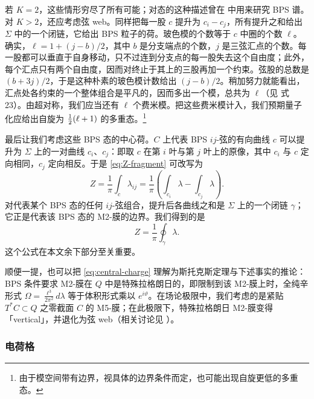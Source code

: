 
若 $K=2$，这些情形穷尽了所有可能；对态的这种描述曾在 \cite{Klemm:1996bj,Brandhuber:1996xk} 中用来研究 BPS 谱。对 $K>2$，还应考虑弦 web。同样把每一股 $c$ 提升为 $c_i - c_j$，所有提升之和给出 $\Sigma$ 中的一个闭链，它给出 BPS 粒子的荷。玻色模的个数等于 $c$ 中圈的个数 $\ell$。确实，$\ell = 1+(j-b)/2$，其中 $b$ 是分支端点的个数，$j$ 是三弦汇点的个数。每一股都可以垂直于自身移动，只不过连到分支点的每一股失去这个自由度；此外，每个汇点只有两个自由度，因而对终止于其上的三股再加一个约束。弦股的总数是 $(b+3j)/2$，于是这种朴素的玻色模计数给出 $(j-b)/2$。稍加努力就能看出，汇点处各约束的一个整体组合是平凡的，因而多出一个模，总共为 $\ell$（见 \cite{Aharony:1997bh} 式 23）。由超对称，我们应当还有 $\ell$ 个费米模。把这些费米模计入，我们预期量子化应给出自旋为 $\tfrac{1}{2}(\ell+1)$ 的多重态。\footnote{由于模空间带有边界，视具体的边界条件而定，也可能出现自旋更低的多重态。}

最后让我们考虑这些 BPS 态的中心荷。$C$ 上代表 BPS $ij$-弦的有向曲线 $c$ 可以提升为 $\Sigma$ 上的一对曲线 $c_i$、$c_j$：即取 $c$ 在第 $i$ 叶与第 $j$ 叶上的原像，其中 $c_i$ 与 $c$ 定向相同，$c_j$ 定向相反。于是 \eqref{eq:Z-fragment} 可改写为
\begin{equation} \label{eq:central-lambda}
Z = \frac{1}{\pi} \int_c \lambda_{ij} = \frac{1}{\pi} \left( \int_{c_i} \lambda - \int_{c_j} \lambda \right).
\end{equation}
对代表某个 BPS 态的任何 $ij$-弦组合，提升后各曲线之和是 $\Sigma$ 上的一个闭链 $\gamma$；它正是代表该 BPS 态的 M2-膜的边界。我们得到的是
\begin{equation} \label{eq:central-charge}
Z = \frac{1}{\pi} \oint_\gamma \lambda.
\end{equation}
这个公式在本文余下部分至关重要。

顺便一提，也可以把 \eqref{eq:central-charge} 理解为斯托克斯定理与下述事实的推论：BPS 条件要求 M2-膜在 $Q$ 中是特殊拉格朗日的，即限制到该 M2-膜上时，全纯辛形式 $\Omega = \frac{\ell^3}{2 \pi^2} d \lambda$ 等于体积形式乘以 $e^{i \vartheta}$。在场论极限中，我们考虑的是紧贴 $T^* C \subset Q$ 之零截面 $C$ 的 M5-膜；在此极限下，特殊拉格朗日 M2-膜变得「vertical」，并退化为弦 web（相关讨论见 \cite{Mikhailov:1997jv}）。

\subsubsection{电荷格} \label{subsubsec:ChargeLattices}

